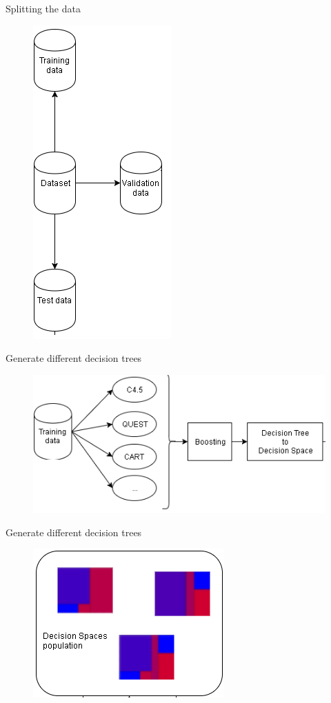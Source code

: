 \documentclass[english]{beamer}
\begin{document}
\begin{frame}{Splitting the data}
	\vspace{-1em}
	\begin{figure}
		\centering
		\includegraphics[scale=0.5]{figures/split_data.png}
	\end{figure}	
\end{frame}

\begin{frame}{Generate different decision trees}
	\begin{figure}
		\centering
		\includegraphics[scale=0.8]{figures/generate_dt.png}
	\end{figure}	
\end{frame}

\begin{frame}{Generate different decision trees}
	\begin{figure}
		\centering
		\includegraphics[scale=1]{figures/dt_population.png}
	\end{figure}	
\end{frame}
\end{document}
